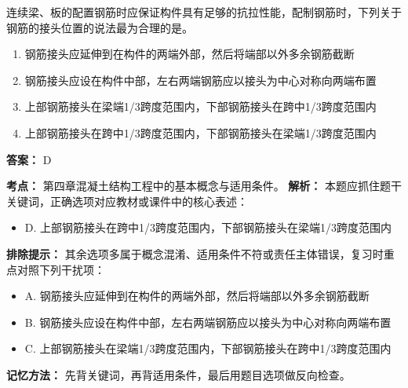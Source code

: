 \documentclass[UTF8,fontset=fandol,11pt]{ctexart}
\begin{document}
\begin{quizbox}[title={第 28 题}]
连续梁、板的配置钢筋时应保证构件具有足够的抗拉性能，配制钢筋时，下列关于钢筋的接头位置的说法最为合理的是。\\
\begin{enumerate}[label=\Alph*.]
\item 钢筋接头应延伸到在构件的两端外部，然后将端部以外多余钢筋截断
\item 钢筋接头应设在构件中部，左右两端钢筋应以接头为中心对称向两端布置
\item 上部钢筋接头在梁端1/3跨度范围内，下部钢筋接头在跨中1/3跨度范围内
\item 上部钢筋接头在跨中1/3跨度范围内，下部钢筋接头在梁端1/3跨度范围内
\end{enumerate}
\textbf{答案：} D
\vspace{0.25em}
\begin{answerbox}[title={考点解析}]
\textbf{考点：} 第四章混凝土结构工程中的基本概念与适用条件。
\textbf{解析：} 本题应抓住题干关键词，正确选项对应教材或课件中的核心表述：
\begin{itemize}
\item D. 上部钢筋接头在跨中1/3跨度范围内，下部钢筋接头在梁端1/3跨度范围内
\end{itemize}
\textbf{排除提示：} 其余选项多属于概念混淆、适用条件不符或责任主体错误，复习时重点对照下列干扰项：
\begin{itemize}
\item A. 钢筋接头应延伸到在构件的两端外部，然后将端部以外多余钢筋截断
\item B. 钢筋接头应设在构件中部，左右两端钢筋应以接头为中心对称向两端布置
\item C. 上部钢筋接头在梁端1/3跨度范围内，下部钢筋接头在跨中1/3跨度范围内
\end{itemize}
\textbf{记忆方法：} 先背关键词，再背适用条件，最后用题目选项做反向检查。
\end{answerbox}
\end{quizbox}
\end{document}
